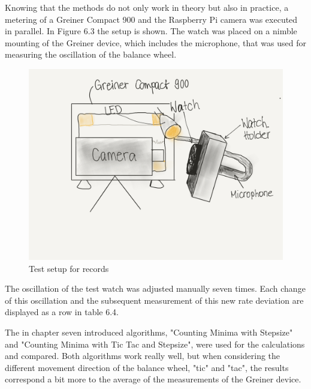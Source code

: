 \documentclass[12pt, a4paper]{report}
\begin{document}
    Knowing that the methods do not only work in theory but also in practice, a metering of a Greiner Compact 900 and the Raspberry Pi camera was executed in parallel. In Figure 6.3 the setup is shown. The watch was placed on a nimble mounting of the Greiner device, which includes the microphone, that was used for measuring the oscillation of the balance wheel. 
    
      \begin{figure}[H]
        \centering
        \includegraphics[scale=0.3]{Images/parallel_test_setup}
        
        \caption{Test setup for records}
        \end{figure}
        
   The oscillation of the test watch was adjusted manually seven times. Each change of this oscillation and the subsequent measurement of this new rate deviation are displayed as a row in table 6.4. 
   
   The in chapter seven introduced algorithms, "Counting Minima with Stepsize" and "Counting Minima with Tic Tac and Stepsize", were used for the calculations and compared. Both algorithms work really well, but when considering the different movement direction of the balance wheel, "tic" and "tac", the results correspond a bit more to the average of the measurements of the Greiner device.
\end{document}
